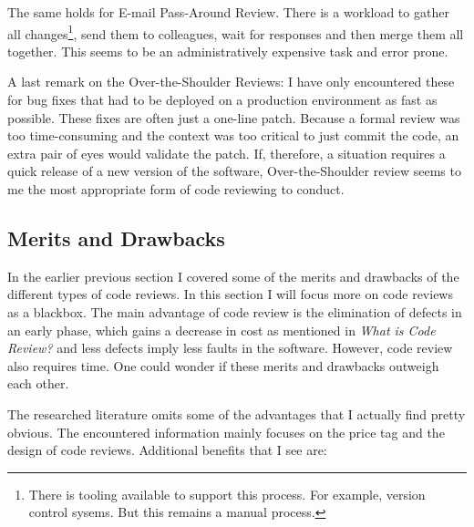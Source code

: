 The same holds for E-mail Pass-Around Review. There is a workload to gather all changes\footnote{There is tooling available to support this process. For example, version control sysems. But this remains a manual process.},
send them to colleagues, wait for responses and then merge them all together.
This seems to be an administratively expensive task and error prone.

A last remark on the Over-the-Shoulder Reviews:
I have only encountered these for bug fixes that had to be deployed on a production environment as fast as possible.
These fixes are often just a one-line patch.
Because a formal review was too time-consuming and the context was too critical to just commit the code, an extra pair of eyes would validate the patch.
If, therefore, a situation requires a quick release of a new version of the software, Over-the-Shoulder review seems to me the most appropriate form of code reviewing to conduct.

\subsection*{Merits and Drawbacks}

In the earlier previous section I covered some of the merits and drawbacks of the different types of code reviews. In this section I will focus more on code reviews as a blackbox.
The main advantage of code review is the elimination of defects in an early phase, which gains a decrease in cost as mentioned in \textit{What is Code Review?} and less defects imply less faults in the software.
However, code review also requires time.
One could wonder if these merits and drawbacks outweigh each other.

The researched literature omits some of the advantages that I actually find pretty obvious.
The encountered information mainly focuses on the price tag and the design of code reviews.
Additional benefits that I see are:

